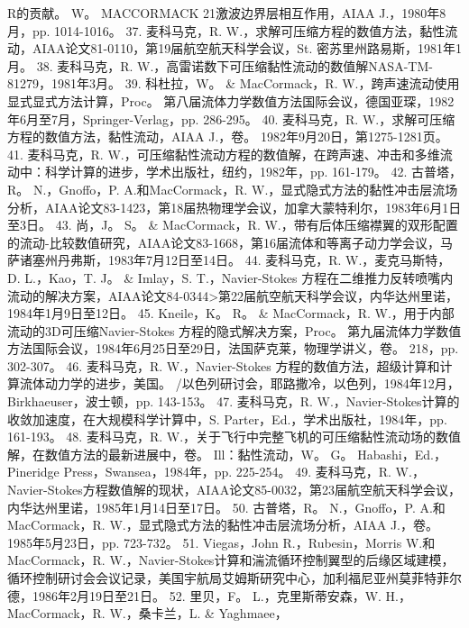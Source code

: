 \documentclass[UTF8,11pt,a4paper,openany,fontset=fandol]{ctexbook}
\begin{document}
R的贡献。 W。 MACCORMACK 21激波边界层相互作用，AIAA J.，1980年8月，pp. 1014-1016。 37. 麦科马克，R. W.，求解可压缩方程的数值方法，黏性流动，AIAA论文81-0110，第19届航空航天科学会议，St. 密苏里州路易斯，1981年1月。 38. 麦科马克，R. W.，高雷诺数下可压缩黏性流动的数值解NASA-TM-81279，1981年3月。 39. 科杜拉，W。 \& MacCormack，R. W.，跨声速流动使用显式显式方法计算，Proc。 第八届流体力学数值方法国际会议，德国亚琛，1982年6月至7月，Springer-Verlag，pp. 286-295。 40. 麦科马克，R. W.，求解可压缩方程的数值方法，黏性流动，AIAA J.，卷。 1982年9月20日，第1275-1281页。 41. 麦科马克，R. W.，可压缩黏性流动方程的数值解，在跨声速、冲击和多维流动中：科学计算的进步，学术出版社，纽约，1982年，pp. 161-179。 42. 古普塔，R。 N.，Gnoffo，P. A.和MacCormack，R. W.，显式隐式方法的黏性冲击层流场分析，AIAA论文83-1423，第18届热物理学会议，加拿大蒙特利尔，1983年6月1日至3日。 43. 尚，J。 S。 \& MacCormack，R. W.，带有后体压缩襟翼的双形配置的流动-比较数值研究，AIAA论文83-1668，第16届流体和等离子动力学会议，马萨诸塞州丹弗斯，1983年7月12日至14日。 44. 麦科马克，R. W.，麦克马斯特，D. L.，Kao，T. J。 \& Imlay，S. T.，Navier-Stokes 方程在二维推力反转喷嘴内流动的解决方案，AIAA论文84-0344>第22届航空航天科学会议，内华达州里诺，1984年1月9日至12日。 45. Kneile，K。 R。 \& MacCormack，R. W.，用于内部流动的3D可压缩Navier-Stokes 方程的隐式解决方案，Proc。 第九届流体力学数值方法国际会议，1984年6月25日至29日，法国萨克莱，物理学讲义，卷。 218，pp. 302-307。 46. 麦科马克，R. W.，Navier-Stokes 方程的数值方法，超级计算和计算流体动力学的进步，美国。 /以色列研讨会，耶路撒冷，以色列，1984年12月，Birkhaeuser，波士顿，pp. 143-153。 47. 麦科马克，R. W.，Navier-Stokes计算的收敛加速度，在大规模科学计算中，S. Parter，Ed.，学术出版社，1984年，pp. 161-193。 48. 麦科马克，R. W.，关于飞行中完整飞机的可压缩黏性流动场的数值解，在数值方法的最新进展中，卷。 Ill：黏性流动，W。 G。 Habashi，Ed.，Pineridge Press，Swansea，1984年，pp. 225-254。 49. 麦科马克，R. W.，Navier-Stokes方程数值解的现状，AIAA论文85-0032，第23届航空航天科学会议，内华达州里诺，1985年1月14日至17日。 50. 古普塔，R。 N.，Gnoffo，P. A.和MacCormack，R. W.，显式隐式方法的黏性冲击层流场分析，AIAA J.，卷。 1985年5月23日，pp. 723-732。 51. Viegas，John R.，Rubesin，Morris W.和MacCormack，R. W.，Navier-Stokes计算和湍流循环控制翼型的后缘区域建模，循环控制研讨会会议记录，美国宇航局艾姆斯研究中心，加利福尼亚州莫菲特菲尔德，1986年2月19日至21日。 52. 里贝，F。 L.，克里斯蒂安森，W. H.，MacCormack，R. W.，桑卡兰，L. \& Yaghmaee，
\end{document}
